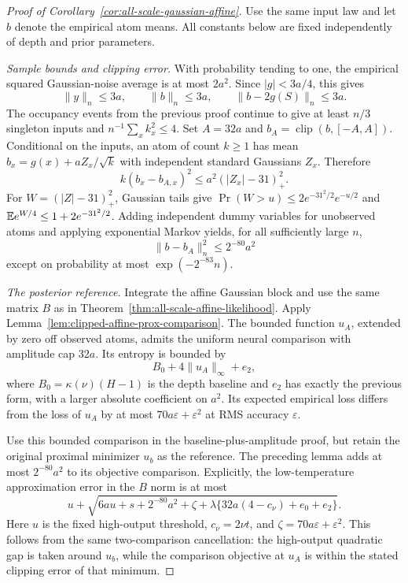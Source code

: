 \begin{proof}[Proof of Corollary~\ref{cor:all-scale-gaussian-affine}]
Use the same input law and let $b$ denote the empirical atom means. All constants below are fixed independently of depth and prior parameters.

\emph{Sample bounds and clipping error.}
With probability tending to one, the empirical squared Gaussian-noise average is at most $2a^2$. Since $|g|<3a/4$, this gives
\[
 \|y\|_n\le3a,\qquad \|b\|_n\le3a,
 \qquad \|b-2g(S)\|_n\le3a.
\]
The occupancy events from the previous proof continue to give at least $n/3$ singleton inputs and $n^{-1}\sum_xk_x^2\le4$.
Set $A=32a$ and $b_A=\operatorname{clip}(b,[-A,A])$. Conditional on the inputs, an atom of count $k\ge1$ has mean $b_x=g(x)+aZ_x/\sqrt k$ with independent standard Gaussians $Z_x$. Therefore
\[
 k(b_x-b_{A,x})^2\le a^2(|Z_x|-31)_+^2.
\]
For $W=(|Z|-31)_+^2$, Gaussian tails give
$\Pr(W>u)\le2e^{-31^2/2}e^{-u/2}$ and $\mathbb E e^{W/4}\le1+2e^{-31^2/2}$. Adding independent dummy variables for unobserved atoms and applying exponential Markov yields, for all sufficiently large $n$,
\[
 \|b-b_A\|_n^2\le2^{-80}a^2
\]
except on probability at most $\exp(-2^{-83}n)$.

\emph{The posterior reference.}
Integrate the affine Gaussian block and use the same matrix $B$ as in Theorem~\ref{thm:all-scale-affine-likelihood}. Apply Lemma~\ref{lem:clipped-affine-prox-comparison}. The bounded function $u_A$, extended by zero off observed atoms, admits the uniform neural comparison with amplitude cap $32a$. Its entropy is bounded by
\[
 B_0+4\|u_A\|_\infty+e_2,
\]
where $B_0=\kappa(\nu)(H-1)$ is the depth baseline and $e_2$ has exactly the previous form, with a larger absolute coefficient on $a^2$. Its expected empirical loss differs from the loss of $u_A$ by at most $70a\varepsilon+\varepsilon^2$ at RMS accuracy $\varepsilon$.

Use this bounded comparison in the baseline-plus-amplitude proof, but retain the original proximal minimizer $u_b$ as the reference. The preceding lemma adds at most $2^{-80}a^2$ to its objective comparison. Explicitly, the low-temperature approximation error in the $B$ norm is at most
\[
 u+\sqrt{6au+s+2^{-80}a^2+\zeta+
             \lambda\{32a(4-c_\nu)+e_0+e_2\}}.
\]
Here $u$ is the fixed high-output threshold, $c_\nu=2\nu t$, and $\zeta=70a\varepsilon+\varepsilon^2$. This follows from the same two-comparison cancellation: the high-output quadratic gap is taken around $u_b$, while the comparison objective at $u_A$ is within the stated clipping error of that minimum.


\end{proof}
